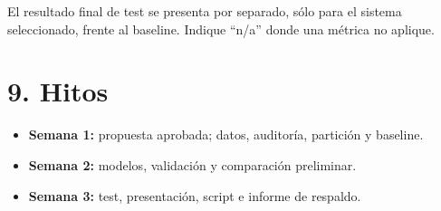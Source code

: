 \documentclass[11pt,letterpaper]{article}
\begin{document}
El resultado final de test se presenta por separado, sólo para el sistema seleccionado, frente al baseline. Indique ``n/a'' donde una métrica no aplique.

\section*{9. Hitos}
\begin{itemize}
\item \textbf{Semana 1:} propuesta aprobada; datos, auditoría, partición y baseline.
\item \textbf{Semana 2:} modelos, validación y comparación preliminar.
\item \textbf{Semana 3:} test, presentación, script e informe de respaldo.
\end{itemize}
\end{document}
